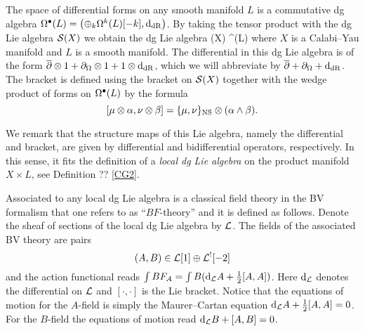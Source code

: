\documentclass[11pt]{amsart}
\def\pv{{\rm PV}}
\begin{document}



The space of differential forms on any smooth manifold $L$ is a commutative dg algebra $\Omega^{\bullet}(L) = \left(\oplus_{k}\Omega^{k}(L)[-k], {\rm d}_{{\rm dR}}\right)$.
By taking the tensor product with the dg Lie algebra $\mathcal S(X)$ we obtain the dg Lie algebra
\beqn\label{localLie}
  \cS(X) \; \Hat{\otimes} \; \Omega^{\bu}(L)
\eeqn
where $X$ is a Calabi--Yau manifold and $L$ is a smooth manifold.
The differential in this dg Lie algebra is of the form $\overline{\partial} \otimes 1 + \partial_\Omega \otimes 1 + 1 \otimes {\rm d}_{\rm dR}$, which we will abbreviate by $\overline{\partial} + \partial_\Omega + {\rm d}_{\rm dR}$.
The bracket is defined using the bracket on $\mathcal S(X)$ together with the wedge product of forms on $\Omega^\bullet(L)$ by the formula
\[
  [\mu \otimes \alpha, \nu \otimes \beta] = \{\mu, \nu\}_{\rm NS} \otimes (\alpha \wedge \beta) .
\]


We remark that the structure maps of this Lie algebra, namely the differential and bracket, are given by differential and bidifferential operators, respectively.
In this sense, it fits the definition of a {\em local dg Lie algebra} on the product manifold $X \times L$, see Definition ?? \ref{CG2}.

Associated to any local dg Lie algebra is a classical field theory in the BV formalism that one refers to as ``$BF$-theory'' and it is defined as follows.
Denote the sheaf of sections of the local dg Lie algebra by $\mathcal L$.
The fields of the associated BV theory are pairs
\[
  (A, B) \in \mathcal L[1] \oplus \mathcal L^{!}[-2]
\]
and the action functional reads $\int B F_{A} = \int B ({\rm d}_{\mathcal L}A + \frac12 [A,A])$.
Here ${\rm d}_{\mathcal L}$ denotes the differential on $\mathcal L$ and $[\cdot,\cdot]$ is the Lie bracket.
Notice that the equations of motion for the $A$-field is simply the Maurer--Cartan equation ${\rm d}_\mathcal L A + \frac12 [A,A] = 0$.
For the $B$-field the equations of motion read ${\rm d}_\mathcal L B + [A, B] = 0$.
\end{document}
